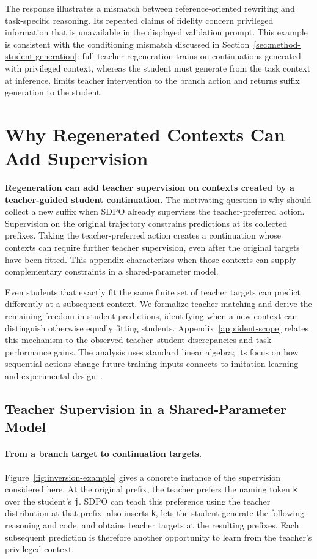 The response illustrates a mismatch between reference-oriented rewriting and task-specific reasoning. Its repeated claims of fidelity concern privileged information that is unavailable in the displayed validation prompt. This example is consistent with the conditioning mismatch discussed in Section~\ref{sec:method-student-generation}: full teacher regeneration trains on continuations generated with privileged context, whereas the student must generate from the task context at inference. \method{} limits teacher intervention to the branch action and returns suffix generation to the student.



\section{Why Regenerated Contexts Can Add Supervision}
\label{app:conditional-advantage}

\textbf{Regeneration can add teacher supervision on contexts created by a teacher-guided student continuation.} The motivating question is why \method{} should collect a new suffix when SDPO already supervises the teacher-preferred action. Supervision on the original trajectory constrains predictions at its collected prefixes. Taking the teacher-preferred action creates a continuation whose contexts can require further teacher supervision, even after the original targets have been fitted. This appendix characterizes when those contexts can supply complementary constraints in a shared-parameter model.

Even students that exactly fit the same finite set of teacher targets can predict differently at a subsequent context. We formalize teacher matching and derive the remaining freedom in student predictions, identifying when a new context can distinguish otherwise equally fitting students. Appendix~\ref{app:ident-scope} relates this mechanism to the observed teacher--student discrepancies and task-performance gains. The analysis uses standard linear algebra; its focus on how sequential actions change future training inputs connects to imitation learning~\citep{ross2011dagger} and experimental design~\citep{fontaine2021design}.

\subsection{Teacher Supervision in a Shared-Parameter Model}
\label{app:ident-model}

\paragraph{From a branch target to continuation targets.} Figure~\ref{fig:inversion-example} gives a concrete instance of the supervision considered here. At the original prefix, the teacher prefers the naming token \texttt{k} over the student's \texttt{j}. SDPO can teach this preference using the teacher distribution at that prefix. \method{} also inserts \texttt{k}, lets the student generate the following reasoning and code, and obtains teacher targets at the resulting prefixes. Each subsequent prediction is therefore another opportunity to learn from the teacher's privileged context.

